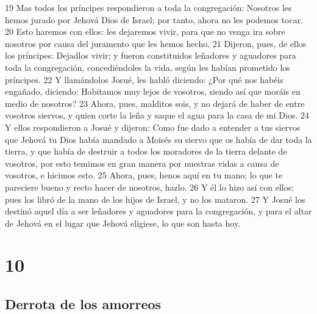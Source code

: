 19 Mas todos los príncipes respondieron a toda la congregación: Nosotros les hemos jurado por Jehová Dios de Israel; por tanto, ahora no les podemos tocar.
20 Esto haremos con ellos: les dejaremos vivir, para que no venga ira sobre nosotros por causa del juramento que les hemos hecho.
21 Dijeron, pues, de ellos los príncipes: Dejadlos vivir; y fueron constituidos leñadores y aguadores para toda la congregación, concediéndoles la vida, según les habían prometido los príncipes.
22 Y llamándolos Josué, les habló diciendo: ¿Por qué nos habéis engañado, diciendo: Habitamos muy lejos de vosotros, siendo así que moráis en medio de nosotros?
23 Ahora, pues, malditos sois, y no dejará de haber de entre vosotros siervos, y quien corte la leña y saque el agua para la casa de mi Dios.
24 Y ellos respondieron a Josué y dijeron: Como fue dado a entender a tus siervos que Jehová tu Dios había mandado a Moisés su siervo que os había de dar toda la tierra, y que había de destruir a todos los moradores de la tierra delante de vosotros, por esto temimos en gran manera por nuestras vidas a causa de vosotros, e hicimos esto.
25 Ahora, pues, henos aquí en tu mano; lo que te pareciere bueno y recto hacer de nosotros, hazlo.
26 Y él lo hizo así con ellos; pues los libró de la mano de los hijos de Israel, y no los mataron.
27 Y Josué los destinó aquel día a ser leñadores y aguadores para la congregación, y para el altar de Jehová en el lugar que Jehová eligiese, lo que son hasta hoy.

\chapter{10}

\section*{Derrota de los amorreos}

